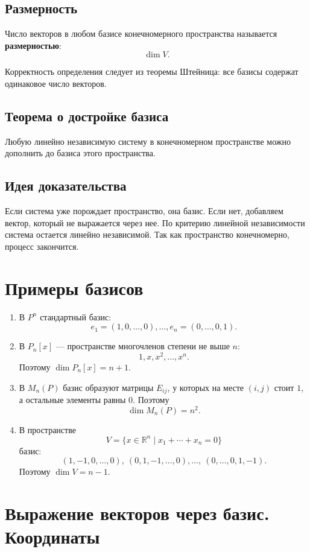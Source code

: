 \documentclass[12pt,a4paper]{article}
\newcommand{\R}{\mathbb{R}}
\begin{document}
\subsection*{Размерность}

Число векторов в любом базисе конечномерного пространства называется \textbf{размерностью}:
\[
    \dim V.
\]

Корректность определения следует из теоремы Штейница: все базисы содержат одинаковое число векторов.

\subsection*{Теорема о достройке базиса}

Любую линейно независимую систему в конечномерном пространстве можно дополнить до базиса этого пространства.

\subsection*{Идея доказательства}

Если система уже порождает пространство, она базис. Если нет, добавляем вектор, который не выражается через нее. По критерию линейной независимости система остается линейно независимой. Так как пространство конечномерно, процесс закончится.

\section{Примеры базисов}

\begin{enumerate}
    \item В $P^n$ стандартный базис:
    \[
        e_1=(1,0,\ldots,0),\ldots,e_n=(0,\ldots,0,1).
    \]
    \item В $P_n[x]$ --- пространстве многочленов степени не выше $n$:
    \[
        1,x,x^2,\ldots,x^n.
    \]
    Поэтому $\dim P_n[x]=n+1$.
    \item В $M_n(P)$ базис образуют матрицы $E_{ij}$, у которых на месте $(i,j)$ стоит $1$, а остальные элементы равны $0$. Поэтому
    \[
        \dim M_n(P)=n^2.
    \]
    \item В пространстве
    \[
        V=\{x\in\R^n\mid x_1+\cdots+x_n=0\}
    \]
    базис:
    \[
        (1,-1,0,\ldots,0),\ (0,1,-1,\ldots,0),\ldots,\ (0,\ldots,0,1,-1).
    \]
    Поэтому $\dim V=n-1$.
\end{enumerate}

\section{Выражение векторов через базис. Координаты}
\end{document}
